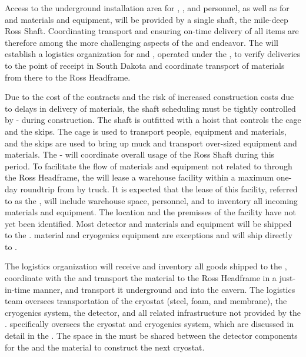 Access to the underground installation area for , , and  personnel, as well as for  and  materials and equipment, will be provided by a single shaft, the mile-deep Ross Shaft.
Coordinating transport and ensuring on-time delivery of all items are therefore among the more challenging aspects of the  and  endeavor.
The  will establish a logistics organization for  and , operated under the , to verify deliveries to the point of receipt in South Dakota and coordinate transport of materials from there to the Ross Headframe.

Due to the cost of the  contracts and the risk of increased construction costs due to delays in delivery of materials, the shaft scheduling must be tightly controlled by - during construction.
The shaft is outfitted with a hoist that controls the cage and the skips.
The cage is used to transport people, equipment and materials, and the skips are used to bring up muck and transport over-sized equipment and materials.
The -  will coordinate overall usage of the Ross Shaft during this period.
To facilitate the flow of materials and equipment not related to  through the Ross Headframe, the  will lease a warehouse facility within a maximum one-day roundtrip from  by truck.
It is expected that the lease of this facility, referred to as the , will include warehouse space, personnel, and  to inventory all incoming materials and equipment.
The location and the premisses  of the facility have not yet been identified.
Most detector and materials and equipment will be shipped to the .
 material and cryogenics equipment are exceptions and will ship directly to .

The  logistics organization will receive and inventory all goods shipped to the , coordinate with the  and transport the material to the Ross Headframe in a just-in-time manner, and transport it underground and into the cavern.
The  logistics team oversees transportation of the cryostat (steel, foam, and membrane), the cryogenics system, the detector, and all related infrastructure not provided by the .
 specifically oversees the cryostat and cryogenics system, which are discussed in detail in the  .
The space in the  must be shared between the detector components for the  and the  material to construct the next cryostat.

